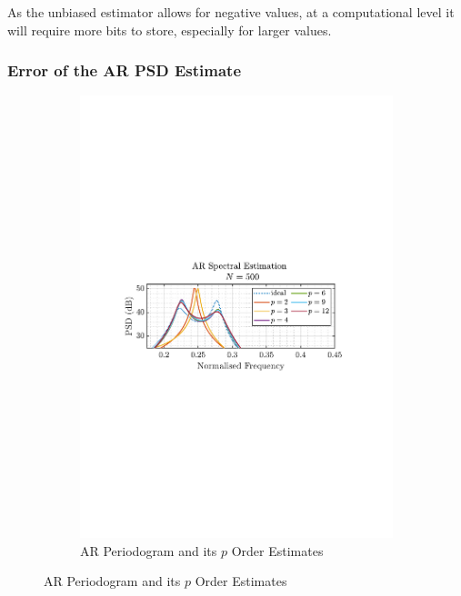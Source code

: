 \documentclass[12pt]{article}
\begin{document}
	As the unbiased estimator allows for negative values, at a computational level it will require more bits to store, especially for larger values.
	
	\pagebreak
	
	\subsubsection{Error of the AR PSD Estimate}
	\begin{figure}[H]
		\centering
		\begin{subfigure}{0.49\textwidth}
			\centering
			\includegraphics[trim={2.2cm 11.2cm 3.15cm  11.2cm}, clip, width=\textwidth]{../MATLAB/figures/q1_4b_fig14.pdf} 
			\captionsetup{justification=centering}
			\caption{AR Periodogram and its $p$ Order Estimates}
		\end{subfigure}

\end{figure}
\end{document}
